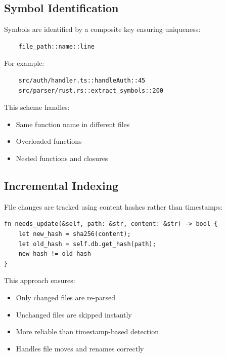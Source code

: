 \subsection{Symbol Identification}

Symbols are identified by a composite key ensuring uniqueness:

\begin{verbatim}
    file_path::name::line
\end{verbatim}

For example:
\begin{verbatim}
    src/auth/handler.ts::handleAuth::45
    src/parser/rust.rs::extract_symbols::200
\end{verbatim}

This scheme handles:
\begin{itemize}
    \item Same function name in different files
    \item Overloaded functions
    \item Nested functions and closures
\end{itemize}

\subsection{Incremental Indexing}

File changes are tracked using content hashes rather than timestamps:

\begin{lstlisting}[style=rustcode, caption={Incremental update detection}]
fn needs_update(&self, path: &str, content: &str) -> bool {
    let new_hash = sha256(content);
    let old_hash = self.db.get_hash(path);
    new_hash != old_hash
}
\end{lstlisting}

This approach ensures:
\begin{itemize}
    \item Only changed files are re-parsed
    \item Unchanged files are skipped instantly
    \item More reliable than timestamp-based detection
    \item Handles file moves and renames correctly
\end{itemize}
